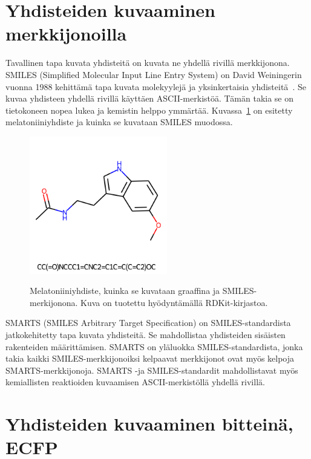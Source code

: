 \documentclass[finnish,twoside,censored,tkt,sw-line]{HYthesisML}
\begin{document}
\section{Yhdisteiden kuvaaminen merkkijonoilla}

Tavallinen tapa kuvata yhdisteitä on kuvata ne yhdellä rivillä merkkijonona.
SMILES (Simplified Molecular Input Line Entry System) on David Weiningerin vuonna 1988 kehittämä tapa kuvata molekyylejä ja yksinkertaisia yhdisteitä~\cite{WeiningerSMILES}.
Se kuvaa yhdisteen yhdellä rivillä käyttäen ASCII-merkistöä.
Tämän takia se on tietokoneen nopea lukea ja kemistin helppo ymmärtää.
Kuvassa~\ref{fig:melatonin} on esitetty melatoniiniyhdiste ja kuinka se kuvataan SMILES muodossa.

\begin{figure}[!ht]
    \centering
    \includegraphics[width=6cm, height=6cm]{melatonin-smiles.png}
    \caption{Melatoniiniyhdiste, kuinka se kuvataan graaffina ja SMILES-merkijonona.
        Kuva on tuotettu hyödyntämällä RDKit-kirjastoa.}
    {\label{fig:melatonin}}
\end{figure}

SMARTS (SMILES Arbitrary Target Specification) on SMILES-standardista jatkokehitetty tapa kuvata yhdisteitä.
Se mahdollistaa yhdisteiden sisäisten rakenteiden määrittämisen.
SMARTS on yläluokka SMILES-standardista, jonka takia kaikki SMILES-merkkijonoiksi kelpaavat merkkijonot ovat myös kelpoja SMARTS-merkkijonoja.
SMARTS -ja SMILES-standardit mahdollistavat myös kemiallisten reaktioiden kuvaamisen ASCII-merkistöllä yhdellä rivillä.

\section{Yhdisteiden kuvaaminen bitteinä, ECFP}
\end{document}
